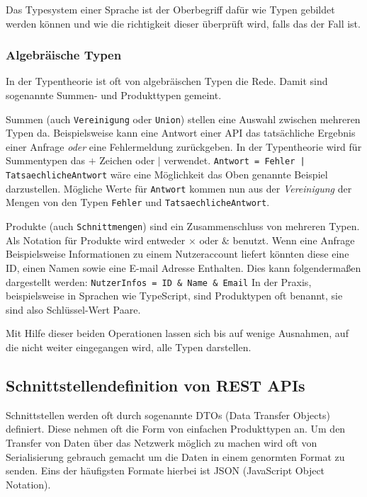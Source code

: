 Das Typesystem einer Sprache ist der Oberbegriff dafür wie Typen gebildet werden können und wie die richtigkeit dieser
überprüft wird, falls das der Fall ist.

\subsubsection{Algebräische Typen} \label{sec:algebraic-types}

In der Typentheorie ist oft von algebräischen Typen die Rede. Damit sind sogenannte Summen- und Produkttypen gemeint.

Summen (auch \texttt{Vereinigung} oder \texttt{Union}) stellen eine Auswahl zwischen mehreren Typen da. Beispielsweise kann eine Antwort einer API das tatsächliche
Ergebnis einer Anfrage \textit{oder} eine Fehlermeldung zurückgeben. In der Typentheorie wird für Summentypen das $+$ Zeichen oder $|$ verwendet.
\lstinline{Antwort = Fehler | TatsaechlicheAntwort} wäre eine Möglichkeit das Oben genannte Beispiel darzustellen.
Mögliche Werte für \lstinline{Antwort} kommen nun aus der \textit{Vereinigung} der Mengen von den Typen 
\lstinline{Fehler} und \lstinline{TatsaechlicheAntwort}.

Produkte (auch \texttt{Schnittmengen}) sind ein Zusammenschluss von mehreren Typen.
Als Notation für Produkte wird entweder $\times$ oder $\&$ benutzt.
Wenn eine Anfrage Beispielsweise Informationen zu einem Nutzeraccount liefert könnten
diese eine ID, einen Namen sowie eine E-mail Adresse Enthalten.
Dies kann folgendermaßen dargestellt werden: \lstinline{NutzerInfos = ID & Name & Email}
In der Praxis, beispielsweise in Sprachen wie TypeScript, sind Produktypen oft benannt, sie sind also Schlüssel-Wert Paare.

Mit Hilfe dieser beiden Operationen lassen sich bis auf wenige Ausnahmen, auf die nicht weiter eingegangen wird, alle Typen darstellen.

\subsection{Schnittstellendefinition von REST APIs}

Schnittstellen werden oft durch sogenannte DTOs (Data Transfer Objects) definiert. Diese nehmen oft die Form von einfachen Produkttypen an.
Um den Transfer von Daten über das Netzwerk möglich zu machen wird oft von Serialisierung gebrauch gemacht um die Daten in einem genormten 
Format zu senden. Eins der häufigsten Formate hierbei ist JSON (JavaScript Object Notation).

